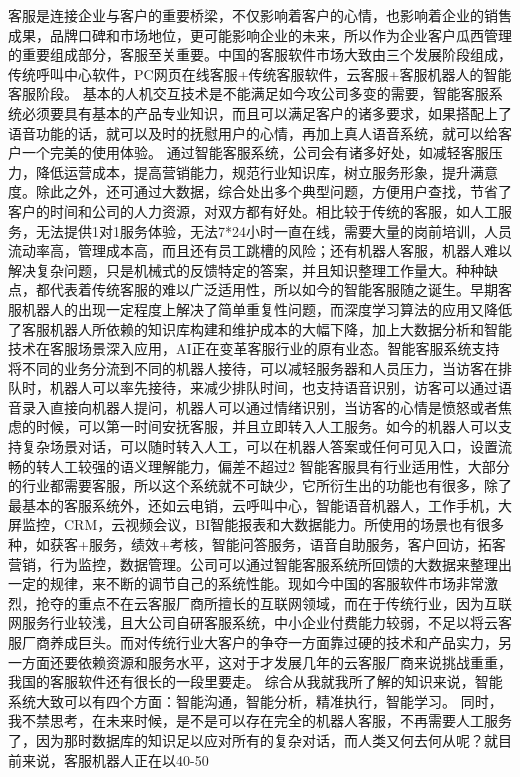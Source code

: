     客服是连接企业与客户的重要桥梁，不仅影响着客户的心情，也影响着企业的销售成果，品牌口碑和市场地位，更可能影响企业的未来，所以作为企业客户瓜西管理的重要组成部分，客服至关重要。中国的客服软件市场大致由三个发展阶段组成，传统呼叫中心软件，PC网页在线客服+传统客服软件，云客服+客服机器人的智能客服阶段。
     基本的人机交互技术是不能满足如今攻公司多变的需要，智能客服系统必须要具有基本的产品专业知识，而且可以满足客户的诸多要求，如果搭配上了语音功能的话，就可以及时的抚慰用户的心情，再加上真人语音系统，就可以给客户一个完美的使用体验。
    通过智能客服系统，公司会有诸多好处，如减轻客服压力，降低运营成本，提高营销能力，规范行业知识库，树立服务形象，提升满意度。除此之外，还可通过大数据，综合处出多个典型问题，方便用户查找，节省了客户的时间和公司的人力资源，对双方都有好处。相比较于传统的客服，如人工服务，无法提供1对1服务体验，无法7*24小时一直在线，需要大量的岗前培训，人员流动率高，管理成本高，而且还有员工跳槽的风险；还有机器人客服，机器人难以解决复杂问题，只是机械式的反馈特定的答案，并且知识整理工作量大。种种缺点，都代表着传统客服的难以广泛适用性，所以如今的智能客服随之诞生。早期客服机器人的出现一定程度上解决了简单重复性问题，而深度学习算法的应用又降低了客服机器人所依赖的知识库构建和维护成本的大幅下降，加上大数据分析和智能技术在客服场景深入应用，AI正在变革客服行业的原有业态。智能客服系统支持将不同的业务分流到不同的机器人接待，可以减轻服务器和人员压力，当访客在排队时，机器人可以率先接待，来减少排队时间，也支持语音识别，访客可以通过语音录入直接向机器人提问，机器人可以通过情绪识别，当访客的心情是愤怒或者焦虑的时候，可以第一时间安抚客服，并且立即转入人工服务。如今的机器人可以支持复杂场景对话，可以随时转入人工，可以在机器人答案或任何可见入口，设置流畅的转人工较强的语义理解能力，偏差不超过2%
   智能客服具有行业适用性，大部分的行业都需要客服，所以这个系统就不可缺少，它所衍生出的功能也有很多，除了最基本的客服系统外，还如云电销，云呼叫中心，智能语音机器人，工作手机，大屏监控，CRM，云视频会议，BI智能报表和大数据能力。所使用的场景也有很多种，如获客+服务，绩效+考核，智能问答服务，语音自助服务，客户回访，拓客营销，行为监控，数据管理。公司可以通过智能客服系统所回馈的大数据来整理出一定的规律，来不断的调节自己的系统性能。现如今中国的客服软件市场非常激烈，抢夺的重点不在云客服厂商所擅长的互联网领域，而在于传统行业，因为互联网服务行业较浅，且大公司自研客服系统，中小企业付费能力较弱，不足以将云客服厂商养成巨头。而对传统行业大客户的争夺一方面靠过硬的技术和产品实力，另一方面还要依赖资源和服务水平，这对于才发展几年的云客服厂商来说挑战重重，我国的客服软件还有很长的一段里要走。
    综合从我就我所了解的知识来说，智能系统大致可以有四个方面：智能沟通，智能分析，精准执行，智能学习。 同时，我不禁思考，在未来时候，是不是可以存在完全的机器人客服，不再需要人工服务了，因为那时数据库的知识足以应对所有的复杂对话，而人类又何去何从呢？就目前来说，客服机器人正在以40-50%
